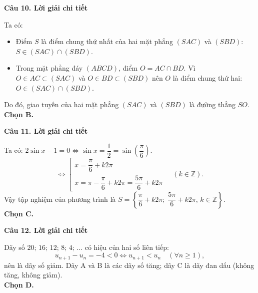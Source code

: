 \documentclass[12pt, a4paper]{article}
\begin{document}
\noindent\textbf{Câu 10. Lời giải chi tiết}\par
\begin{tcolorbox}[enhanced,breakable,colback=solutionbg,colframe=secondary!50!black,frame hidden,borderline west={3pt}{0pt}{secondary!50!black}]
Ta có:
\begin{itemize}[leftmargin=1.5em]
\item Điểm $S$ là điểm chung thứ nhất của hai mặt phẳng $(SAC)$ và $(SBD)$: $S \in (SAC) \cap (SBD)$.
\item Trong mặt phẳng đáy $(ABCD)$, điểm $O = AC \cap BD$. Vì $O \in AC \subset (SAC)$ và $O \in BD \subset (SBD)$ nên $O$ là điểm chung thứ hai: $O \in (SAC) \cap (SBD)$.
\end{itemize}
Do đó, giao tuyến của hai mặt phẳng $(SAC)$ và $(SBD)$ là đường thẳng $SO$.\\
\textbf{Chọn B.}
\end{tcolorbox}

\noindent\textbf{Câu 11. Lời giải chi tiết}\par
\begin{tcolorbox}[enhanced,breakable,colback=solutionbg,colframe=secondary!50!black,frame hidden,borderline west={3pt}{0pt}{secondary!50!black}]
Ta có: $2\sin x - 1 = 0 \Leftrightarrow \sin x = \dfrac{1}{2} = \sin\left(\dfrac{\pi}{6}\right)$.
$$\Leftrightarrow \left[\begin{array}{l}
x = \dfrac{\pi}{6} + k2\pi \\[6pt]
x = \pi - \dfrac{\pi}{6} + k2\pi = \dfrac{5\pi}{6} + k2\pi
\end{array}\right. \quad (k\in\mathbb{Z}).$$
Vậy tập nghiệm của phương trình là $S = \left\{\dfrac{\pi}{6} + k2\pi;\; \dfrac{5\pi}{6} + k2\pi,\, k\in\mathbb{Z}\right\}$.\\
\textbf{Chọn C.}
\end{tcolorbox}

\noindent\textbf{Câu 12. Lời giải chi tiết}\par
\begin{tcolorbox}[enhanced,breakable,colback=solutionbg,colframe=secondary!50!black,frame hidden,borderline west={3pt}{0pt}{secondary!50!black}]
Dãy số $20;\, 16;\, 12;\, 8;\, 4;\,\dots$ có hiệu của hai số liên tiếp:
$$u_{n+1} - u_n = -4 < 0 \Leftrightarrow u_{n+1} < u_n\quad (\forall n \ge 1),$$
nên là dãy số giảm. Dãy A và B là các dãy số tăng; dãy C là dãy đan dấu (không tăng, không giảm).\\
\textbf{Chọn D.}
\end{tcolorbox}
\end{document}
